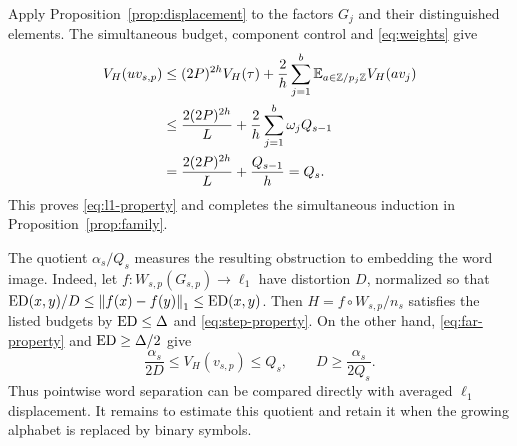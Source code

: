 Apply Proposition~\ref{prop:displacement} to the factors $G_j$ and
their distinguished elements. The simultaneous budget, component
control and \eqref{eq:weights} give
\begin{align*}
 V_H(uv_{s,p})
 &\le(2P)^{2h}V_H(\tau)
      +\frac2h\sum_{j=1}^b\mathbb E_{a\in\mathbb Z/p_j\mathbb Z}V_H(av_j)\\
 &\le\frac{2(2P)^{2h}}L
      +\frac2h\sum_{j=1}^b\omega_jQ_{s-1}\\
 &=\frac{2(2P)^{2h}}L+\frac{Q_{s-1}}h=Q_s.
\end{align*}
This proves \eqref{eq:l1-property} and completes the simultaneous
induction in Proposition~\ref{prop:family}.

The quotient $\alpha_s/Q_s$ measures the resulting obstruction to
embedding the word image. Indeed, let
$f:W_{s,p}(G_{s,p})\to\ell_1$ have distortion $D$, normalized so that
$\operatorname{ED}(x,y)/D\le\left\lVert f(x)-f(y)\right\rVert_1\le\operatorname{ED}(x,y)$.
Then $H=f\circ W_{s,p}/n_s$ satisfies the listed budgets by
$\operatorname{ED}\le\Delta$ and \eqref{eq:step-property}. On the other hand,
\eqref{eq:far-property} and $\operatorname{ED}\ge\Delta/2$ give
\[
 \frac{\alpha_s}{2D}\le V_H(v_{s,p})\le Q_s,
 \qquad D\ge\frac{\alpha_s}{2Q_s}.
\]
Thus pointwise word separation can be compared directly with averaged
$\ell_1$ displacement. It remains to estimate this quotient and retain
it when the growing alphabet is replaced by binary symbols.
